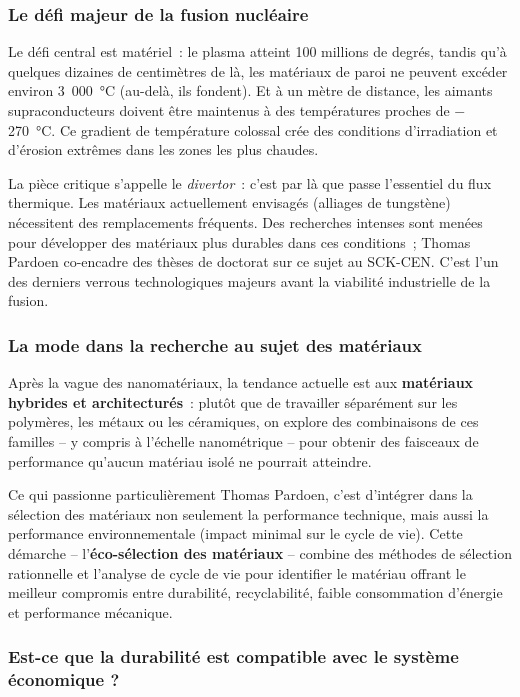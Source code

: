 \subsubsection{Le défi majeur de la fusion nucléaire}

Le défi central est matériel~: le plasma atteint 100 millions de degrés, tandis qu'à quelques dizaines de centimètres de là, les matériaux de paroi ne peuvent excéder environ 3~000~°C (au-delà, ils fondent). Et à un mètre de distance, les aimants supraconducteurs doivent être maintenus à des températures proches de $-$270~°C. Ce gradient de température colossal crée des conditions d'irradiation et d'érosion extrêmes dans les zones les plus chaudes.

La pièce critique s'appelle le \emph{divertor}~: c'est par là que passe l'essentiel du flux thermique. Les matériaux actuellement envisagés (alliages de tungstène) nécessitent des remplacements fréquents. Des recherches intenses sont menées pour développer des matériaux plus durables dans ces conditions~; Thomas Pardoen co-encadre des thèses de doctorat sur ce sujet au SCK-CEN. C'est l'un des derniers verrous technologiques majeurs avant la viabilité industrielle de la fusion.

\subsubsection{La mode dans la recherche au sujet des matériaux}

Après la vague des nanomatériaux, la tendance actuelle est aux \textbf{matériaux hybrides et architecturés}~: plutôt que de travailler séparément sur les polymères, les métaux ou les céramiques, on explore des combinaisons de ces familles -- y compris à l'échelle nanométrique -- pour obtenir des faisceaux de performance qu'aucun matériau isolé ne pourrait atteindre.

Ce qui passionne particulièrement Thomas Pardoen, c'est d'intégrer dans la sélection des matériaux non seulement la performance technique, mais aussi la performance environnementale (impact minimal sur le cycle de vie). Cette démarche -- l'\textbf{éco-sélection des matériaux} -- combine des méthodes de sélection rationnelle et l'analyse de cycle de vie pour identifier le matériau offrant le meilleur compromis entre durabilité, recyclabilité, faible consommation d'énergie et performance mécanique.

\subsubsection{Est-ce que la durabilité est compatible avec le système économique ?}

